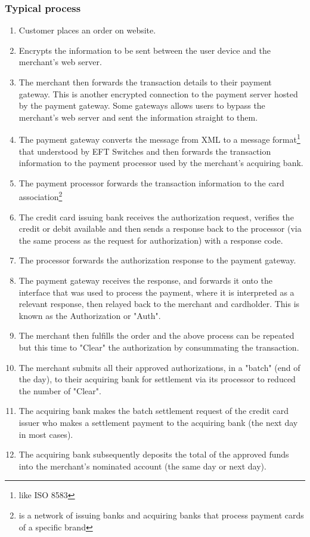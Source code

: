 \documentclass[12pt,a4paper]{article}
\begin{document}
	\subsubsection{Typical process}
	\begin{enumerate}
		\item Customer places an order on website.
		\item Encrypts the information to be sent between the user device and the merchant's web server.
		\item The merchant then forwards the transaction details to their payment gateway. This is another encrypted connection to the payment server hosted by the payment gateway. Some gateways allows users to bypass the merchant's web server and sent the information straight to them.
		\item The payment gateway converts the message from XML to  a message format\footnote{like ISO 8583} that understood by EFT Switches and then forwards the transaction information to the payment processor used by the merchant's acquiring bank.
		\item The payment processor forwards the transaction information to the card association\footnote{is a network of issuing banks and acquiring banks that process payment cards of a specific brand}
		\item The credit card issuing bank receives the authorization request, verifies the credit or debit available and then sends a response back to the processor (via the same process as the request for authorization) with a response code.
		\item The processor forwards the authorization response to the payment gateway.
		\item The payment gateway receives the response, and forwards it onto the interface that was used to process the payment, where it is interpreted as a relevant response, then relayed back to the merchant and cardholder. This is known as the Authorization or "Auth".
		\item The merchant then fulfills the order and the above process can be repeated but this time to "Clear" the authorization by consummating the transaction.
		\item The merchant submits all their approved authorizations, in a "batch" (end of the day), to their acquiring bank for settlement via its processor to reduced the number of "Clear".
		\item The acquiring bank makes the batch settlement request of the credit card issuer who makes a settlement payment to the acquiring bank (the next day in most cases).
		\item The acquiring bank subsequently deposits the total of the approved funds into the merchant's nominated account (the same day or next day).
	\end{enumerate}
\end{document}
